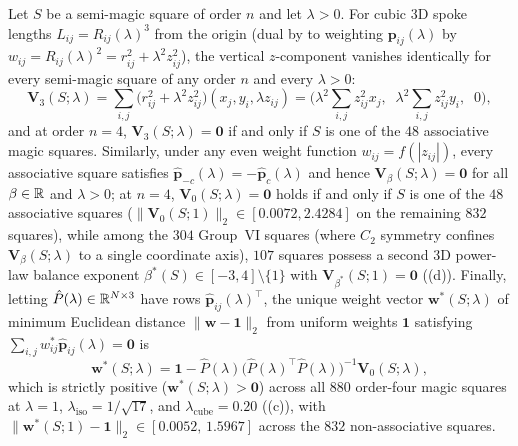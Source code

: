 \begin{theorem}
\label{thm:3d-power}
Let $S$ be a semi-magic square of order $n$ and let $\lambda>0$. For cubic 3D spoke lengths $L_{ij}=R_{ij}(\lambda)^3$ from the origin (dual by  to weighting $\mathbf p_{ij}(\lambda)$ by $w_{ij}=R_{ij}(\lambda)^2=r_{ij}^2+\lambda^2z_{ij}^2$), the vertical $z$-component vanishes identically for every semi-magic square of any order $n$ and every $\lambda>0$:
\begin{equation}
\label{eq:V3-exact}
\mathbf V_3(S;\lambda) = \sum_{i,j}\bigl(r_{ij}^2+\lambda^2z_{ij}^2\bigr)(x_j,y_i,\lambda z_{ij})
= \biggl(\lambda^2\sum_{i,j}z_{ij}^2 x_j,\;\; \lambda^2\sum_{i,j}z_{ij}^2 y_i,\;\; 0\biggr),
\end{equation}
and at order $n=4$, $\mathbf V_3(S;\lambda)=\mathbf 0$ if and only if $S$ is one of the $48$ associative magic squares. Similarly, under any even weight function $w_{ij}=f(|z_{ij}|)$, every associative square satisfies $\hat{\mathbf p}_{-c}(\lambda)=-\hat{\mathbf p}_c(\lambda)$ and hence $\mathbf V_\beta(S;\lambda)=\mathbf 0$ for all $\beta\in\mathbb{R}$ and $\lambda>0$; at $n=4$, $\mathbf V_0(S;\lambda)=\mathbf 0$ holds if and only if $S$ is one of the $48$ associative squares ($\|\mathbf V_0(S;1)\|_2\in[0.0072,2.4284]$ on the remaining $832$ squares), while among the $304$ Group~VI squares (where $C_2$ symmetry confines $\mathbf V_\beta(S;\lambda)$ to a single coordinate axis), $107$ squares possess a second 3D power-law balance exponent $\beta^*(S)\in[-3,4]\setminus\{1\}$ with $\mathbf V_{\beta^*}(S;1)=\mathbf 0$ ((d)). Finally, letting $\hat P(\lambda)\in\mathbb{R}^{N\times 3}$ have rows $\hat{\mathbf p}_{ij}(\lambda)^{\top}$, the unique weight vector $\mathbf w^*(S;\lambda)$ of minimum Euclidean distance $\|\mathbf w-\mathbf 1\|_2$ from uniform weights $\mathbf 1$ satisfying $\sum_{i,j}w_{ij}^*\hat{\mathbf p}_{ij}(\lambda)=\mathbf 0$ is
\begin{equation}
\label{eq:w-star}
\mathbf w^*(S;\lambda) = \mathbf 1 - \hat P(\lambda)\bigl(\hat P(\lambda)^{\top}\hat P(\lambda)\bigr)^{-1}\mathbf V_0(S;\lambda),
\end{equation}
which is strictly positive ($\mathbf w^*(S;\lambda)>\mathbf 0$) across all $880$ order-four magic squares at $\lambda=1$, $\lambda_{\mathrm{iso}}=1/\sqrt{17}$, and $\lambda_{\mathrm{cube}}=0.20$ ((c)), with $\|\mathbf w^*(S;1)-\mathbf 1\|_2\in[0.0052,\,1.5967]$ across the $832$ non-associative squares.
\end{theorem}


